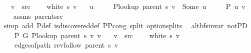 \begin{isabellebody}
\ \ \ {\isachardoublequoteopen}v\ {\isasymnoteq}\ src{\isachardoublequoteclose}\isanewline
\ \ \ {\isachardoublequoteopen}{\isasymnot}\ white\ s\ v{\isachardoublequoteclose}\isanewline
\ \ \ u\ \isanewline
\ \ \ \ {\isachardoublequoteopen}P{\isacharunderscore}{\kern0pt}lookup\ {\isacharparenleft}{\kern0pt}parent\ s{\isacharparenright}{\kern0pt}\ v\ {\isacharequal}{\kern0pt}\ Some\ u{\isachardoublequoteclose}\isanewline
\ \ \ \ {\isachardoublequoteopen}{\isasymnot}\ P{\isacharprime}{\kern0pt}{\isacharprime}{\kern0pt}\ {\isacharbraceleft}{\kern0pt}u{\isacharcomma}{\kern0pt}\ v{\isacharbraceright}{\kern0pt}{\isachardoublequoteclose}%
\endisataginvisible
{\isafoldinvisible}%
%
\isadeliminvisible
\isanewline
%
\endisadeliminvisible
%
\isadelimproof
\ \ %
\endisadelimproof
%
\isatagproof
{}\isamarkupfalse%
\ assms\ parent{\isacharunderscore}{\kern0pt}src\isanewline
\ \ \isamarkupfalse%
\ {\isacharparenleft}{\kern0pt}simp\ add{\isacharcolon}{\kern0pt}\ P{\isacharprime}{\kern0pt}{\isacharunderscore}{\kern0pt}def\ is{\isacharunderscore}{\kern0pt}discovered{\isacharunderscore}{\kern0pt}def\ P{\isacharunderscore}{\kern0pt}P{\isacharprime}{\kern0pt}{\isacharprime}{\kern0pt}{\isacharunderscore}{\kern0pt}cong\ split{\isacharcolon}{\kern0pt}\ option{\isachardot}{\kern0pt}splits{\isacharparenleft}{\kern0pt}{}{\isacharparenright}{\kern0pt}{\isacharparenright}{\kern0pt}%
\endisatagproof
{\isafoldproof}%
%
\isadelimproof
\isanewline
%
\endisadelimproof
%
\isadeliminvisible
\isanewline
%
\endisadeliminvisible
%
\isataginvisible
{}\isamarkupfalse%
\ {\isacharparenleft}{\kern0pt}\ alt{\isacharunderscore}{\kern0pt}bfs{\isacharunderscore}{\kern0pt}invar{\isacharparenright}{\kern0pt}\ not{\isacharunderscore}{\kern0pt}P{\isacharprime}{\kern0pt}D{\isacharcolon}{\kern0pt}\isanewline
\ \ \ {\isachardoublequoteopen}{\isasymnot}\ P{\isacharprime}{\kern0pt}\ G{}\ {\isacharparenleft}{\kern0pt}P{\isacharunderscore}{\kern0pt}lookup\ {\isacharparenleft}{\kern0pt}parent\ s{\isacharparenright}{\kern0pt}\ v{\isacharparenright}{\kern0pt}\ v{\isachardoublequoteclose}\isanewline
\ \ \ {\isachardoublequoteopen}v\ {\isasymnoteq}\ src{\isachardoublequoteclose}\isanewline
\ \ \ {\isachardoublequoteopen}{\isasymnot}\ white\ s\ v{\isachardoublequoteclose}\isanewline
\ \ \isanewline
\ \ \ \ {\isachardoublequoteopen}edges{\isacharunderscore}{\kern0pt}of{\isacharunderscore}{\kern0pt}path\ {\isacharparenleft}{\kern0pt}rev{\isacharunderscore}{\kern0pt}follow\ {\isacharparenleft}{\kern0pt}parent\ s{\isacharparenright}{\kern0pt}\ v{\isacharparenright}{\kern0pt}\ {\isasymnoteq}\ {\isacharbrackleft}{\kern0pt}{\isacharbrackright}{\kern0pt}{\isachardoublequoteclose}\isanewline

\end{isabellebody}

